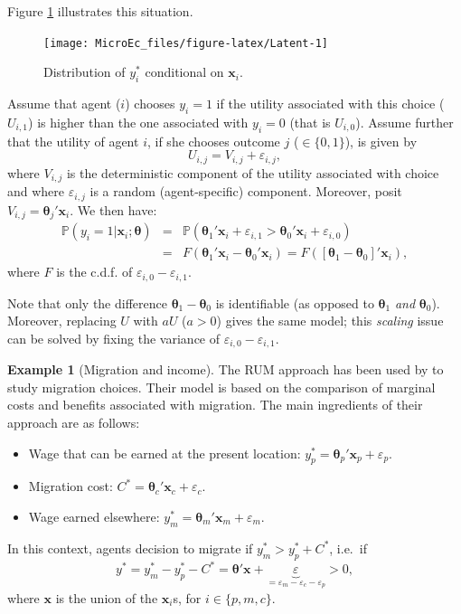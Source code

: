 \documentclass[
  12pt,
]{book}
\providecommand{\tightlist}{%
  \setlength{\itemsep}{0pt}\setlength{\parskip}{0pt}}
\theoremstyle{definition}
\theoremstyle{definition}
\newtheorem{example}{Example}[chapter]
\theoremstyle{definition}
\theoremstyle{definition}
\theoremstyle{remark}
\begin{document}
Figure \ref{fig:Latent} illustrates this situation.

\begin{figure}
\texttt{[image: MicroEc\_files/figure-latex/Latent-1]} \caption{Distribution of $y_i^*$ conditional on $\mathbf{x}_i$.}\label{fig:Latent}
\end{figure}

Assume that agent (\(i\)) chooses \(y_i=1\) if the utility associated with this choice (\(U_{i,1}\)) is higher than the one associated with \(y_i=0\) (that is \(U_{i,0}\)). Assume further that the utility of agent \(i\), if she chooses outcome \(j\) (\(\in \{0,1\}\)), is given by
\[
U_{i,j} = V_{i,j} + \varepsilon_{i,j},
\]
where \(V_{i,j}\) is the deterministic component of the utility associated with choice and where \(\varepsilon_{i,j}\) is a random (agent-specific) component. Moreover, posit \(V_{i,j} = \boldsymbol\theta_j'\mathbf{x}_i\). We then have:
\begin{eqnarray}
\mathbb{P}(y_i = 1|\mathbf{x}_i;\boldsymbol\theta) &=& \mathbb{P}(\boldsymbol\theta_1'\mathbf{x}_i+\varepsilon_{i,1}>\boldsymbol\theta_0'\mathbf{x}_i+\varepsilon_{i,0}) \nonumber\\
&=& F(\boldsymbol\theta_1'\mathbf{x}_i-\boldsymbol\theta_0'\mathbf{x}_i) = F([\boldsymbol\theta_1-\boldsymbol\theta_0]'\mathbf{x}_i),\label{eq:utility}
\end{eqnarray}
where \(F\) is the c.d.f. of \(\varepsilon_{i,0}-\varepsilon_{i,1}\).

Note that only the difference \(\boldsymbol\theta_1-\boldsymbol\theta_0\) is identifiable (as opposed to \(\boldsymbol\theta_1\) \emph{and} \(\boldsymbol\theta_0\)). Moreover, replacing \(U\) with \(aU\) (\(a>0\)) gives the same model; this \emph{scaling} issue can be solved by fixing the variance of \(\varepsilon_{i,0}-\varepsilon_{i,1}\).

\begin{example}[Migration and income]
\protect\hypertarget{exm:migration}{}\label{exm:migration}The RUM approach has been used by \citet{Nakosteen_Zimmer_1980} to study migration choices. Their model is based on the comparison of marginal costs and benefits associated with migration. The main ingredients of their approach are as follows:

\begin{itemize}
\tightlist
\item
  Wage that can be earned at the present location: \(y_p^* = \boldsymbol\theta_p'\mathbf{x}_p + \varepsilon_p\).
\item
  Migration cost: \(C^*= \boldsymbol\theta_c'\mathbf{x}_c + \varepsilon_c\).
\item
  Wage earned elsewhere: \(y_m^* = \boldsymbol\theta_m'\mathbf{x}_m + \varepsilon_m\).
\end{itemize}

In this context, agents decision to migrate if \(y_m^* > y_p^* + C^*\), i.e.~if
\[
y^* = y_m^* -  y_p^* - C^* =  \boldsymbol\theta'\mathbf{x} + \underbrace{\varepsilon}_{=\varepsilon_m - \varepsilon_c - \varepsilon_p}>0,
\]
where \(\mathbf{x}\) is the union of the \(\mathbf{x}_i\)s, for \(i \in \{p,m,c\}\).
\end{example}
\end{document}
